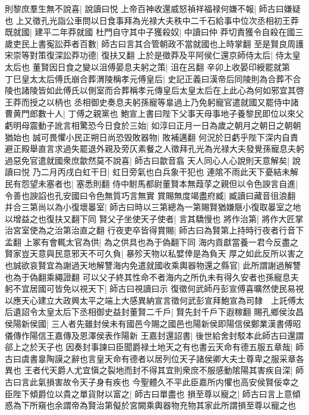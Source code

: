 則黎庶羣生無不說喜|{
	說讀曰悦}
上帝百神收還威怒禎祥福禄何嫌不報|{
	師古曰嫌疑也}
上又徵孔光詣公車問以日食事拜為光禄大夫秩中二千石給事中位次丞相初王莽既就國|{
	建平二年莽就國}
杜門自守其中子獲殺奴|{
	中讀曰仲}
莽切責獲令自殺在國三歲吏民上書寃訟莽者百數|{
	師古曰言其合管朝政不當就國也上時掌翻}
至是賢良周護宋崇等對策復深訟莽功德|{
	復扶又翻}
上於是徵莽及平阿侯仁還京師侍太后|{
	侍太皇太后也}
董賢因日食之變以沮傅晏息夫躬之策|{
	沮在呂翻}
辛卯上收晏印綬罷就第　丁巳皇太太后傅氏崩合葬渭陵稱孝元傅皇后|{
	史記正義曰漢帝后同陵則為合葬不合陵也諸陵皆如此傅氏以側室而合葬稱孝元傳皇后太皇太后在上此心為何如邪宜其啓王莽而授之以柄也}
丞相御史奏息夫躬孫寵等辠過上乃免躬寵官遣就國又罷侍中諸曹黄門郎數十人|{
	丁傅之親黨也}
鮑宣上書曰陛下父事天母事地子養黎民即位以來父虧明母震動子訛言相驚恐今日食於三始|{
	如淳曰正月一日為歲之朝月之朝日之朝朝猶始也}
誠可畏懼小民正朔日尚恐毁敗器物|{
	敗補邁翻}
何況於日虧乎陛下深内自責避正殿舉直言求過失罷退外親及旁仄素餐之人徵拜孔光為光禄大夫發覺孫寵息夫躬過惡免官遣就國衆庶歙然莫不說喜|{
	師古曰歙音翕}
天人同心人心說則天意解矣|{
	說讀曰悦}
乃二月丙戌白虹干日|{
	虹日旁氣也白兵象干犯也}
連隂不雨此天下憂結未解民有怨望未塞者也|{
	塞悉則翻}
侍中駙馬都尉董賢本無葭莩之親但以令色諛言自進|{
	令善也諛諂也孔安國曰令色無質巧言無實}
賞賜無度竭盡府臧|{
	臧讀曰藏音徂浪翻}
并合三第尚以為小復壞㬥室|{
	師古曰時以三第總為一第賜賢猶嫌陿小復取㬥室之地以增益之也復扶又翻下同}
賢父子坐使天子使者|{
	言其驕慢也}
將作治第|{
	將作大匠掌治宮室使為之治第治直之翻}
行夜吏卒皆得賞賜|{
	師古曰為賢第上持時行夜者行音下孟翻}
上冢有會輒太官為供|{
	為之供具也為于偽翻下同}
海内貢獻當養一君今反盡之賢家豈天意與民意邪天不可久負|{
	暴殄天物以私嬖倖是為負天}
厚之如此反所以害之也誠欲哀賢宜為謝過天地解讐海内免遣就國收乘輿器物還之縣官|{
	此所謂謝過解讐也為于偽翻乘繩證翻}
可以父子終其性命不者海内之所仇未有得久安者也孫寵息夫躬不宜居國可皆免以視天下|{
	師古曰視讀曰示}
復徵何武師丹彭宣傅喜曠然使民易視以應天心建立大政興太平之端上大感異納宣言徵何武彭宣拜鮑宣為司隸　上託傅太后遺詔令太皇太后下丞相御史益封董賢二千戶|{
	賢先封千戶下遐稼翻}
賜孔鄉侯汝昌侯陽新侯國|{
	三人者先雖封侯未有國邑今賜之國邑也陽新侯即陽信侯鄭業漢書傅昭儀傳作陽信王嘉傳及恩澤侯表作陽新}
王嘉封還詔書|{
	後世給舍封駁本此師古曰還謂郤上之於天子也}
因奏封事諫曰臣聞爵禄土地天之有也書云天命有德五服五章哉|{
	師古曰虞書辠陶謨之辭也言皇天命有德者以居列位天子諸侯卿大夫士尊卑之服采章各異也}
王者代天爵人尤宜愼之裂地而封不得其宜則衆庶不服感動隂陽其害疾自深|{
	師古曰言此氣損害故令天子身有疾也}
今聖體久不平此臣嘉所内懼也高安侯賢佞幸之臣陛下傾爵位以貴之單貨財以富之|{
	師古曰單盡也}
損至尊以寵之|{
	師古曰言上意傾惑為下所窺也余謂帝為賢治第儗於宮闕乘輿器物充物其家此所謂損至尊以寵之也}
